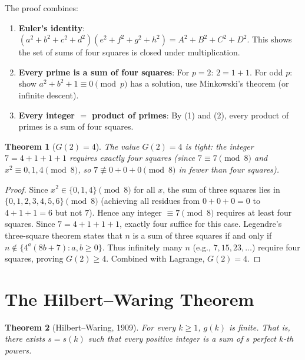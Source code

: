 \documentclass[12pt,a4paper]{amsart}
\newtheorem{theorem}{Theorem}[section]
\theoremstyle{definition}
\begin{document}
The proof combines:
\begin{enumerate}
  \item \textbf{Euler's identity}: $(a^2+b^2+c^2+d^2)(e^2+f^2+g^2+h^2) = A^2+B^2+C^2+D^2$.
    This shows the set of sums of four squares is closed under multiplication.
  \item \textbf{Every prime is a sum of four squares}: For $p=2$: $2 = 1+1$.
    For odd $p$: show $a^2 + b^2 + 1 \equiv 0 \pmod p$ has a solution, use
    Minkowski's theorem (or infinite descent).
  \item \textbf{Every integer $= $ product of primes}: By (1) and (2),
    every product of primes is a sum of four squares.
\end{enumerate}

\begin{theorem}[$G(2) = 4$]\label{thm:g2}
  The value $G(2) = 4$ is tight: the integer $7 = 4+1+1+1$ requires
  exactly four squares (since $7 \equiv 7 \pmod 8$ and
  $x^2 \equiv 0, 1, 4 \pmod 8$, so $7 \not\equiv 0+0+0 \pmod 8$
  in fewer than four squares).
\end{theorem}

\begin{proof}
  Since $x^2 \in \{0, 1, 4\} \pmod 8$ for all $x$, the sum of three squares
  lies in $\{0,1,2,3,4,5,6\} \pmod 8$ (achieving all residues from $0+0+0=0$
  to $4+1+1=6$ but not $7$).  Hence any integer $\equiv 7 \pmod 8$ requires
  at least four squares.  Since $7 = 4+1+1+1$, exactly four suffice for this
  case.  Legendre's three-square theorem states that $n$ is a sum of three
  squares if and only if $n \notin \{4^a(8b+7) : a, b \geq 0\}$.  Thus
  infinitely many $n$ (e.g., $7, 15, 23, \ldots$) require four squares,
  proving $G(2) \geq 4$.  Combined with Lagrange, $G(2) = 4$.
\end{proof}

\section{The Hilbert--Waring Theorem}
\label{sec:hilbert}

\begin{theorem}[Hilbert--Waring, 1909]\label{thm:hilbert_waring}
  For every $k \geq 1$, $g(k)$ is finite.  That is, there exists
  $s = s(k)$ such that every positive integer is a sum of $s$ perfect
  $k$-th powers.
\end{theorem}
\end{document}
